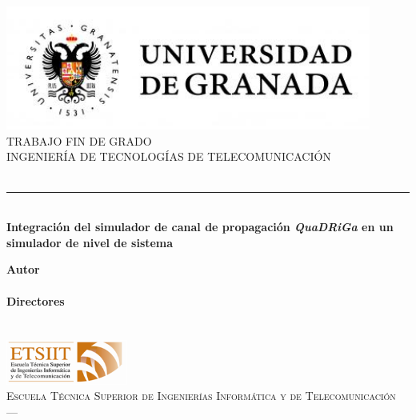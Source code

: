 \begin{titlepage}
 
 
\newlength{\centeroffset}
\setlength{\centeroffset}{-0.5\oddsidemargin}
\addtolength{\centeroffset}{0.5\evensidemargin}
\thispagestyle{empty}

\noindent\hspace*{\centeroffset}\begin{minipage}{\textwidth}


\centering
\includegraphics[width=0.9\textwidth]{imagenes/logo_ugr.jpg}\\[1.4cm]

\textsc{ \Large TRABAJO FIN DE GRADO\\[0.2cm]}
\textsc{INGENIERÍA DE TECNOLOGÍAS DE TELECOMUNICACIÓN}\\[1cm]
% 
{\huge\bfseries \myTitle\\
}
\noindent\rule[-1ex]{\textwidth}{3pt}\\[3.5ex]
{\large\bfseries Integración del simulador de canal de propagación \textit{QuaDRiGa} en un simulador de nivel de sistema}

\centering

\textbf{Autor}\\ {\myName{}}\\[2.5ex]
\textbf{Directores}\\
{\myProf\\
\myOtherProf}\\[2cm]
\includegraphics[width=0.3\textwidth]{imagenes/etsiit_logo.png}\\[0.1cm]
\textsc{Escuela Técnica Superior de Ingenierías Informática y de Telecomunicación}\\
\textsc{---}\\
\myTime
\end{minipage}
\end{titlepage}


